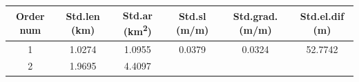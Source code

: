\documentclass[11pt,]{article}
\begin{document}
\begin{longtable}[]{@{}cccccc@{}}
\toprule
\begin{minipage}[b]{0.08\columnwidth}\centering\strut
Order num\strut
\end{minipage} & \begin{minipage}[b]{0.11\columnwidth}\centering\strut
Std.len (km)\strut
\end{minipage} & \begin{minipage}[b]{0.26\columnwidth}\centering\strut
Std.ar (km\textsuperscript{2})\strut
\end{minipage} & \begin{minipage}[b]{0.11\columnwidth}\centering\strut
Std.sl (m/m)\strut
\end{minipage} & \begin{minipage}[b]{0.14\columnwidth}\centering\strut
Std.grad. (m/m)\strut
\end{minipage} & \begin{minipage}[b]{0.13\columnwidth}\centering\strut
Std.el.dif (m)\strut
\end{minipage}\tabularnewline
\midrule
\endhead
\begin{minipage}[t]{0.08\columnwidth}\centering\strut
1\strut
\end{minipage} & \begin{minipage}[t]{0.11\columnwidth}\centering\strut
1.0274\strut
\end{minipage} & \begin{minipage}[t]{0.26\columnwidth}\centering\strut
1.0955\strut
\end{minipage} & \begin{minipage}[t]{0.11\columnwidth}\centering\strut
0.0379\strut
\end{minipage} & \begin{minipage}[t]{0.14\columnwidth}\centering\strut
0.0324\strut
\end{minipage} & \begin{minipage}[t]{0.13\columnwidth}\centering\strut
52.7742\strut
\end{minipage}\tabularnewline
\begin{minipage}[t]{0.08\columnwidth}\centering\strut
2\strut
\end{minipage} & \begin{minipage}[t]{0.11\columnwidth}\centering\strut
1.9695\strut
\end{minipage} & \begin{minipage}[t]{0.26\columnwidth}\centering\strut
4.4097\strut
\end{minipage} & \begin{minipage}[t]{0.11\columnwidth}\centering\strut

\end{minipage}
\end{longtable}
\end{document}
